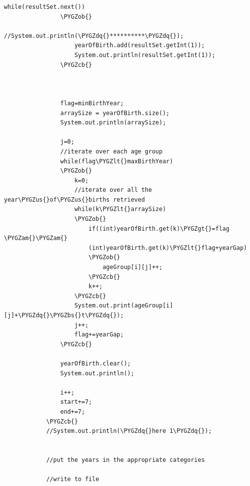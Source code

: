 \documentclass[a4paper,12pt,oneside]{sphinxmanual}
\def\PYGZbs{\char`\\}
\def\PYGZus{\char`\_}
\def\PYGZob{\char`\{}
\def\PYGZcb{\char`\}}
\def\PYGZam{\char`\&}
\def\PYGZlt{\char`\<}
\def\PYGZgt{\char`\>}
\def\PYGZdq{\char`\"}
\begin{document}
\begin{Verbatim}[commandchars=\\\{\}]
                while(resultSet.next())
                \PYGZob{}
                    //System.out.println(\PYGZdq{}**********\PYGZdq{});
                    yearOfBirth.add(resultSet.getInt(1));
                    System.out.println(resultSet.getInt(1));
                \PYGZcb{}



                flag=minBirthYear;
                arraySize = yearOfBirth.size();
                System.out.println(arraySize);

                j=0;
                //iterate over each age group
                while(flag\PYGZlt{}maxBirthYear)
                \PYGZob{}
                    k=0;
                    //iterate over all the year\PYGZus{}of\PYGZus{}births retrieved
                    while(k\PYGZlt{}arraySize)
                    \PYGZob{}
                        if((int)yearOfBirth.get(k)\PYGZgt{}=flag \PYGZam{}\PYGZam{}
                        (int)yearOfBirth.get(k)\PYGZlt{}flag+yearGap)
                        \PYGZob{}
                            ageGroup[i][j]++;
                        \PYGZcb{}
                        k++;
                    \PYGZcb{}
                    System.out.print(ageGroup[i][j]+\PYGZdq{}\PYGZbs{}t\PYGZdq{});
                    j++;
                    flag+=yearGap;
                \PYGZcb{}

                yearOfBirth.clear();
                System.out.println();

                i++;
                start+=7;
                end+=7;
            \PYGZcb{}
            //System.out.println(\PYGZdq{}here 1\PYGZdq{});


            //put the years in the appropriate categories

            //write to file



\end{Verbatim}
\end{document}
